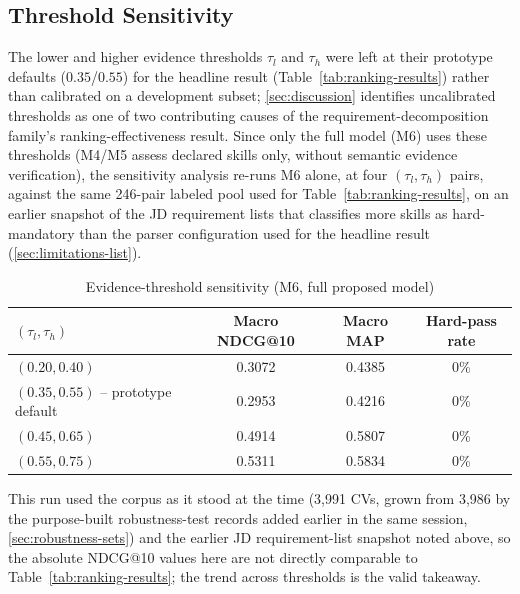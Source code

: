 \documentclass[12pt,a4paper,oneside]{report}
\begin{document}
\subsection{Threshold Sensitivity}
The lower and higher evidence thresholds $\tau_l$ and $\tau_h$ were left at their prototype defaults ($0.35$/$0.55$) for the headline result (Table~\ref{tab:ranking-results}) rather than calibrated on a development subset; \cref{sec:discussion} identifies uncalibrated thresholds as one of two contributing causes of the requirement-decomposition family's ranking-effectiveness result. Since only the full model (M6) uses these thresholds (M4/M5 assess declared skills only, without semantic evidence verification), the sensitivity analysis re-runs M6 alone, at four $(\tau_l,\tau_h)$ pairs, against the same 246-pair labeled pool used for Table~\ref{tab:ranking-results}, on an earlier snapshot of the JD requirement lists that classifies more skills as hard-mandatory than the parser configuration used for the headline result (\cref{sec:limitations-list}).

\begin{table}[htbp]
\centering
\caption{Evidence-threshold sensitivity (M6, full proposed model)}
\label{tab:threshold-sensitivity}
\begin{tabular}{lccc}
\toprule
$(\tau_l,\tau_h)$ & Macro NDCG@10 & Macro MAP & Hard-pass rate \\
\midrule
$(0.20, 0.40)$ & 0.3072 & 0.4385 & 0\% \\
$(0.35, 0.55)$ -- prototype default & 0.2953 & 0.4216 & 0\% \\
$(0.45, 0.65)$ & 0.4914 & 0.5807 & 0\% \\
$(0.55, 0.75)$ & 0.5311 & 0.5834 & 0\% \\
\bottomrule
\end{tabular}
\end{table}

This run used the corpus as it stood at the time (3,991 CVs, grown from 3,986 by the purpose-built robustness-test records added earlier in the same session, \cref{sec:robustness-sets}) and the earlier JD requirement-list snapshot noted above, so the absolute NDCG@10 values here are not directly comparable to Table~\ref{tab:ranking-results}; the trend across thresholds is the valid takeaway.
\end{document}
